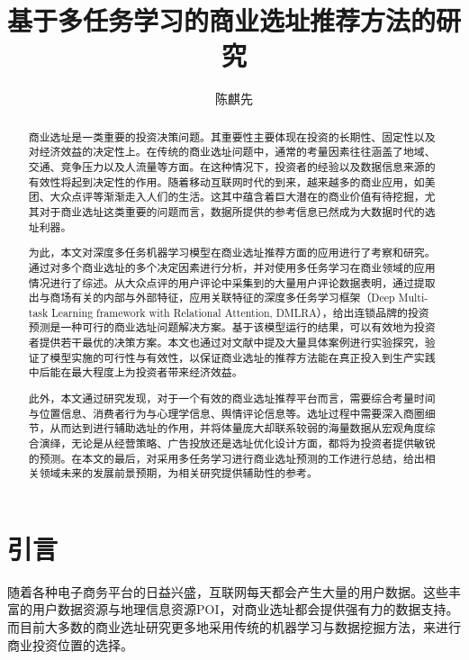 \documentclass{llncs}
\begin{document}
	
\title{基于多任务学习的商业选址推荐方法的研究}
\author{陈麒先}
\maketitle

\begin{abstract}
商业选址是一类重要的投资决策问题。其重要性主要体现在投资的长期性、固定性以及对经济效益的决定性上。在传统的商业选址问题中，通常的考量因素往往涵盖了地域、交通、竞争压力以及人流量等方面。在这种情况下，投资者的经验以及数据信息来源的有效性将起到决定性的作用。随着移动互联网时代的到来，越来越多的商业应用，如美团、大众点评等渐渐走入人们的生活。这其中蕴含着巨大潜在的商业价值有待挖掘，尤其对于商业选址这类重要的问题而言，数据所提供的参考信息已然成为大数据时代的选址利器。

为此，本文对深度多任务机器学习模型在商业选址推荐方面的应用进行了考察和研究。通过对多个商业选址的多个决定因素进行分析，并对使用多任务学习在商业领域的应用情况进行了综述。从大众点评的用户评论中采集到的大量用户评论数据表明，通过提取出与商场有关的内部与外部特征，应用关联特征的深度多任务学习框架（Deep Multi-task Learning framework with Relational Attention, DMLRA），给出连锁品牌的投资预测是一种可行的商业选址问题解决方案。基于该模型运行的结果，可以有效地为投资者提供若干最优的决策方案。本文也通过对文献中提及大量具体案例进行实验探究，验证了模型实施的可行性与有效性，以保证商业选址的推荐方法能在真正投入到生产实践中后能在最大程度上为投资者带来经济效益。

此外，本文通过研究发现，对于一个有效的商业选址推荐平台而言，需要综合考量时间与位置信息、消费者行为与心理学信息、舆情评论信息等。选址过程中需要深入商圈细节，从而达到进行辅助选址的作用，并将体量庞大却联系较弱的海量数据从宏观角度综合演绎，无论是从经营策略、广告投放还是选址优化设计方面，都将为投资者提供敏锐的预测。在本文的最后，对采用多任务学习进行商业选址预测的工作进行总结，给出相关领域未来的发展前景预期，为相关研究提供辅助性的参考。

\end{abstract}

\section{引言}
随着各种电子商务平台的日益兴盛，互联网每天都会产生大量的用户数据。这些丰富的用户数据资源与地理信息资源POI，对商业选址都会提供强有力的数据支持。而目前大多数的商业选址研究更多地采用传统的机器学习与数据挖掘方法，来进行商业投资位置的选择。
\end{document}

